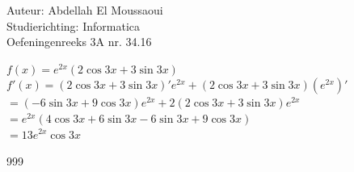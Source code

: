 \documentclass[a4paper]{article}
\begin{document}
  
\noindent \large Auteur: Abdellah El Moussaoui \\
\noindent \large Studierichting: Informatica\\
\noindent \large Oefeningenreeks 3A nr. 34.16\\

\medskip

\normalsize

$f(x)=e^{2x}\left(2\cos 3x +3\sin 3x\right)$\\


$f'(x)=\left(2\cos 3x +3\sin 3x\right)'e^{2x} + \left(2\cos 3x +3\sin 3x\right)\left(e^{2x}\right)'$\\


$=\left(-6\sin 3x +9\cos 3x\right)e^{2x} + 2\left(2\cos 3x +3\sin 3x\right)e^{2x}$\\


$=e^{2x}\left(4\cos 3x +6\sin 3x-6\sin 3x +9\cos 3x\right)$\\

$=13e^{2x}\cos 3x$\\




\begin{thebibliography}{999}
\end{thebibliography}
\end{document}
